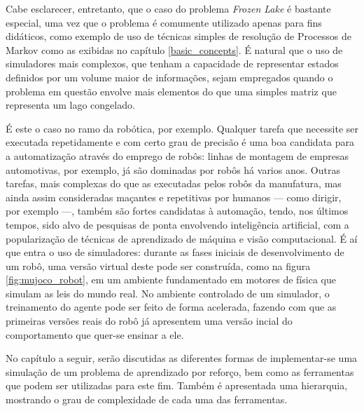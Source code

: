 \documentclass[cic,tc]{iiufrgs}
\begin{document}
Cabe esclarecer, entretanto, que o caso do problema \textit{Frozen Lake} é
bastante especial, uma vez que o problema é comumente utilizado apenas para fins
didáticos, como exemplo de uso de técnicas simples de resolução de Processos de
Markov como as exibidas no capítulo \ref{basic_concepts}. É natural que o uso
de simuladores mais complexos, que tenham a capacidade de representar estados
definidos por um volume maior de informações, sejam empregados quando o problema
em questão envolve mais elementos do que uma simples matriz que representa um
lago congelado.


É este o caso no ramo da robótica, por exemplo. Qualquer tarefa que necessite
ser executada repetidamente e com certo grau de precisão é uma boa candidata
para a automatização através do emprego de robôs: linhas de montagem de
empresas automotivas, por exemplo, já são dominadas por robôs há varios anos.
Outras tarefas, mais complexas do que as executadas pelos robôs da manufatura,
mas ainda assim consideradas maçantes e repetitivas por humanos --- como
dirigir, por exemplo ---, também são fortes candidatas à automação, tendo, nos
últimos tempos, sido alvo de pesquisas de ponta envolvendo inteligência
artificial, com a popularização de técnicas de aprendizado de máquina e visão
computacional. É aí que entra o uso de simuladores: durante as fases iniciais
de desenvolvimento de um robô, uma versão virtual deste pode ser construída,
como na figura \ref{fig:mujoco_robot}, em um ambiente fundamentado em motores
de física que simulam as leis do mundo real. No ambiente controlado de um
simulador, o treinamento do agente pode ser feito de forma acelerada, fazendo
com que as primeiras versões reais do robô já apresentem uma versão incial do
comportamento que quer-se ensinar a ele.


No capítulo a seguir, serão discutidas as diferentes formas de implementar-se
uma simulação de um problema de aprendizado por reforço, bem como as ferramentas
que podem ser utilizadas para este fim. Também é apresentada uma hierarquia,
mostrando o grau de complexidade de cada uma das ferramentas.



%
\end{document}
